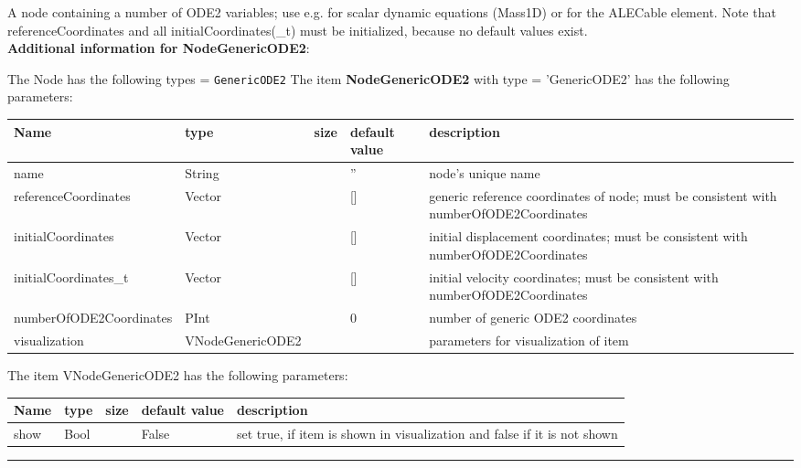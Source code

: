 %
\newpage

\label{sec:item:NodeGenericODE2}
A node containing a number of ODE2 variables; use e.g. for scalar dynamic equations (Mass1D) or for the ALECable element. Note that referenceCoordinates and all initialCoordinates(\_t) must be initialized, because no default values exist.\vspace{12pt}
 \\{\bf Additional information for NodeGenericODE2}:
\bi
  \item The Node has the following types = \texttt{GenericODE2}
\ei
\vspace{12pt} \noindent The item {\bf NodeGenericODE2} with type = 'GenericODE2' has the following parameters:\vspace{-1cm}\\ 
\begin{center}
  \footnotesize
  \begin{longtable}{| p{4.5cm} | p{2.5cm} | p{0.5cm} | p{2.5cm} | p{6cm} |}
    \hline
    \bf Name & \bf type & \bf size & \bf default value & \bf description \\ \hline
    name &     String &      &     '' &     node's unique name\\ \hline
    referenceCoordinates &     Vector &      &     [] &     generic reference coordinates of node; must be consistent with numberOfODE2Coordinates\\ \hline
    initialCoordinates &     Vector &      &     [] &     initial displacement coordinates; must be consistent with numberOfODE2Coordinates\\ \hline
    initialCoordinates\_t &     Vector &      &     [] &     initial velocity coordinates; must be consistent with numberOfODE2Coordinates\\ \hline
    numberOfODE2Coordinates &     PInt &      &     0 &     number of generic ODE2 coordinates\\ \hline
    visualization & VNodeGenericODE2 & & & parameters for visualization of item \\ \hline
	  \end{longtable}
	\end{center}
The item VNodeGenericODE2 has the following parameters:\vspace{-1cm}\\ 
\begin{center}
  \footnotesize
  \begin{longtable}{| p{4.5cm} | p{2.5cm} | p{0.5cm} | p{2.5cm} | p{6cm} |}
    \hline
    \bf Name & \bf type & \bf size & \bf default value & \bf description \\ \hline
    show &     Bool &      &     False &     set true, if item is shown in visualization and false if it is not shown\\ \hline
	  \end{longtable}
	\end{center}
\par\noindent\rule{\textwidth}{0.4pt}
\label{description_NodeGenericODE2}
